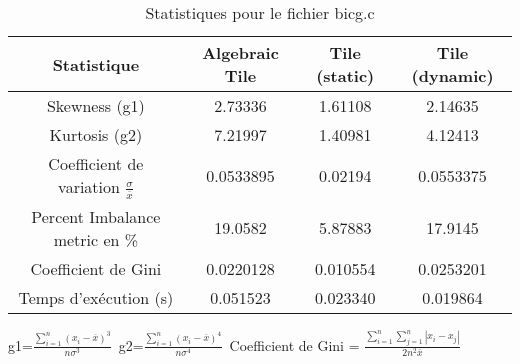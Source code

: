 \documentclass{article}
\begin{document}
\begin{table}[htbp]
  \centering
  \caption{Statistiques pour le fichier bicg.c}
  \begin{tabular}{|c|c|c|c|}
    \hline
    Statistique & Algebraic Tile & Tile (static) & Tile (dynamic) \\ 
    \hline
    Skewness (g1)  & 2.73336 & 1.61108 & 2.14635 \\ 
    Kurtosis (g2)  & 7.21997 & 1.40981 & 4.12413 \\ 
    Coefficient de variation $ \frac{\sigma}{\overline{x}} $ & 0.0533895 & 0.02194 & 0.0553375\\ 
    Percent Imbalance metric en \% & 19.0582 & 5.87883 & 17.9145\\ 
    Coefficient de Gini  & 0.0220128 & 0.010554 & 0.0253201\\ 
    Temps d'exécution (s) &  0.051523    &  0.023340   &  0.019864   \\ 

    \hline
  \end{tabular}
\end{table}\newline
g1=$ \frac{\sum_{i=1}^{n} (x_i - \overline{x})^3}{n\sigma^3} $\
g2=$ \frac{\sum_{i=1}^{n} (x_i - \overline{x})^4}{n\sigma^4} $\
Coefficient de Gini = $ \frac{\sum_{i=1}^{n}\sum_{j=1}^{n} |x_i - x_j|}{2n^2\overline{x}} $\
\newpage
\end{document}
